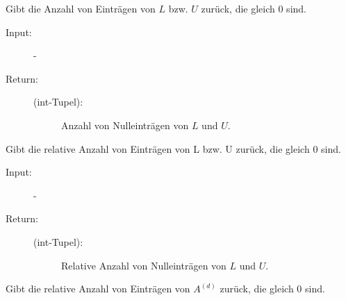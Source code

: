 \documentclass[letterpaper,10pt,ngerman, oneside, openright]{sphinxmanual}
\begin{document}
\begin{fulllineitems}

\begin{fulllineitems}
\label{\detokenize{index:sparse_erw.Sparse.anz_n_lu_abs}}
Gibt die Anzahl von Einträgen von $L$ bzw. $U$ zurück, die gleich 0 sind.

\begin{description}
\item [{Input:}] -
\end{description}
\begin{description}
\item[{Return:}] \leavevmode\begin{description}
\item[{(int-Tupel):}] \leavevmode
Anzahl von Nulleinträgen von $L$ und $U$.

\end{description}

\end{description}

\end{fulllineitems}
\clearpage
{}

\begin{fulllineitems}
\label{\detokenize{index:sparse_erw.Sparse.anz_n_lu_rel}}
Gibt die relative Anzahl von Einträgen von L bzw. U zurück, die gleich 0 sind.

\begin{description}
\item [{Input:}] -
\end{description}
\begin{description}
\item[{Return:}] \leavevmode\begin{description}
\item[{(int-Tupel):}] \leavevmode
Relative Anzahl von Nulleinträgen von $L$ und $U$.

\end{description}

\end{description}

\end{fulllineitems}


\begin{fulllineitems}
\label{\detokenize{index:sparse_erw.Sparse.anz_n_rel}}
Gibt die relative Anzahl von Einträgen von $A^{(d)}$ zurück, die gleich 0 sind.


\end{fulllineitems}
\end{fulllineitems}
\end{document}
